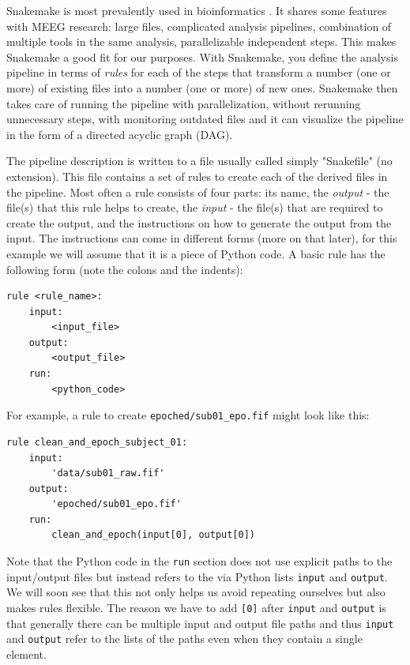 \documentclass[a4paper,man,floatsintext,natbib]{apa6}
\begin{document}
Snakemake is most prevalently used in bioinformatics \citep{molderSustainableDataAnalysis2021a}. It shares some features with MEEG research: large files, complicated analysis pipelines, combination of multiple tools in the same analysis, parallelizable independent steps. This makes Snakemake a good fit for our purposes. With Snakemake, you define the analysis pipeline in terms of \emph{rules} for each of the steps that transform a number (one or more) of existing files into a number (one or more) of new ones. Snakemake then takes care of running the pipeline with parallelization, without rerunning unnecessary steps, with monitoring outdated files and it can visualize the pipeline in the form of a directed acyclic graph (DAG).

The pipeline description is written to a file usually called simply "Snakefile" (no extension). This file contains a set of rules to create each of the derived files in the pipeline. Most often a rule consists of four parts: its name, the \emph{output} - the file(s) that this rule helps to create, the \emph{input} - the file(s) that are required to create the output, and the instructions on how to generate the output from the input. The instructions can come in different forms (more on that later), for this example we will assume that it is a piece of Python code. A basic rule has the following form (note the colons and the indents):

\begin{verbatim}
rule <rule_name>:
    input:
        <input_file>
    output:
        <output_file>
    run:
        <python_code>
\end{verbatim}
For example, a rule to create \verb|epoched/sub01_epo.fif| might look like this:

\begin{verbatim}
rule clean_and_epoch_subject_01:
    input:
        'data/sub01_raw.fif'
    output:
        'epoched/sub01_epo.fif'
    run:
        clean_and_epoch(input[0], output[0])
\end{verbatim}

Note that the Python code in the \verb|run| section does not use explicit paths to the input/output files but instead refers to the via Python lists \verb|input| and \verb|output|. We will soon see that this not only helps us avoid repeating ourselves but also makes rules flexible. The reason we have to add \verb|[0]| after \verb|input| and \verb|output| is that generally there can be multiple input and output file paths and thus \verb|input| and \verb|output| refer to the lists of the paths even when they contain a single element.
\end{document}
